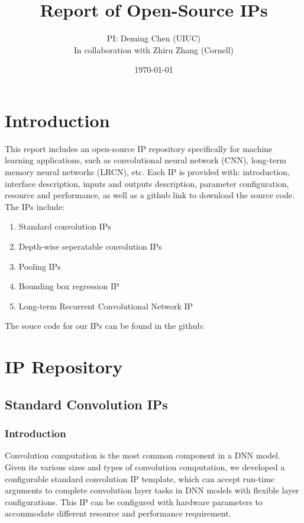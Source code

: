 \documentclass[a4paper, 11pt]{article}
\title{Report of Open-Source IPs}
\author{PI: Deming Chen (UIUC) \\ 
In collaboration with Zhiru Zhang (Cornell)}
\date{\today}
\begin{document}
\maketitle


\section{Introduction}
\label{sec:introduction}

This report includes an open-source IP repository specifically for machine learning applications, such as convolutional neural network (CNN), long-term memory neural networks (LRCN), etc.
Each IP is provided with: introduction, interface description, 
inputs and outputs description, parameter configuration, 
resource and performance, as well as a github link to download the source code.
The IPs include:
\begin{enumerate}
\itemsep-0.2em
    \item {Standard convolution IPs}
    \item {Depth-wise seperatable convolution IPs}
    \item {Pooling IPs}
    \item {Bounding box regression IP}
    \item {Long-term Recurrent Convolutional Network IP}
\end{enumerate}

The souce code for our IPs can be found in the github:

\section{IP Repository\label{Sec: Cur_IP}}

\subsection{Standard Convolution IPs \label{Sec:Para_Conv}}

\subsubsection{Introduction}

Convolution computation is the most common component in a DNN model.
Given its various sizes and types of convolution computation,
we developed a configurable standard convolution IP template,
which can accept run-time arguments to complete convolution layer tasks in DNN models with flexible layer configurations.
This IP can be configured with hardware parameters to accommodate different resource and performance requirement.
\end{document}
